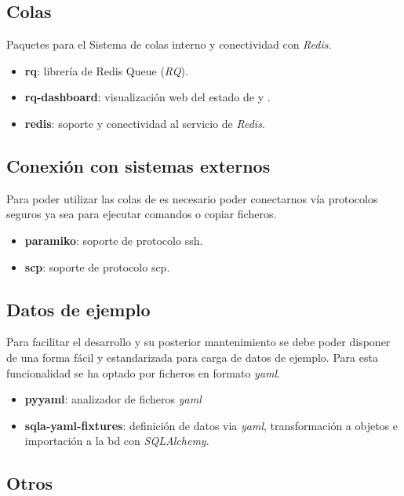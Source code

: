 \documentclass[11pt,spanish,listoffigures,listoftables]{tfgetsinf}
\begin{document}
\subsection{Colas}

Paquetes para el Sistema de colas interno y conectividad con \textit{Redis}.

\begin{itemize}
	\item \textbf{rq}: librería de Redis Queue (\textit{RQ}).
	\item \textbf{rq-dashboard}: visualización web del estado de  y .
	\item \textbf{redis}: soporte y conectividad al servicio de \textit{Redis}.
\end{itemize}

\subsection{Conexión con sistemas externos}

Para poder utilizar las \Gls{cola}s de \kahan es necesario poder conectarnos vía protocolos seguros ya sea para ejecutar comandos o copiar ficheros.

\begin{itemize}
	\item \textbf{paramiko}: soporte de protocolo \acrfull{ssh}.
	\item \textbf{scp}: soporte de protocolo \acrfull{scp}.
\end{itemize}

\subsection{Datos de ejemplo}

Para facilitar el desarrollo y su posterior mantenimiento se debe poder disponer de una forma fácil y estandarizada para carga de datos de ejemplo. Para esta funcionalidad se ha optado por ficheros en formato \textit{yaml}.

\begin{itemize}
	\item \textbf{pyyaml}: analizador de ficheros \textit{yaml} 
	\item \textbf{sqla-yaml-fixtures}: definición de datos via \textit{yaml}, transformación a objetos e importación a la \acrshort{bd} con \textit{SQLAlchemy}.
\end{itemize}

\subsection{Otros}
\end{document}
